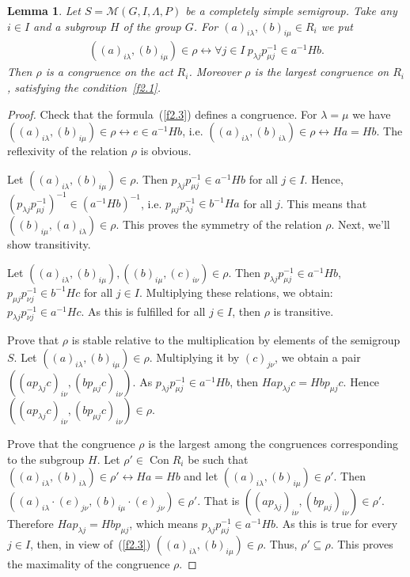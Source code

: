\documentclass{birkau}
\numberwithin{equation}{section}
\theoremstyle{plain}
\newtheorem{lemma}[theorem]{Lemma}
\theoremstyle{definition}
\DeclareMathOperator{\Con}{Con}
\begin{document}
	\begin{lemma} \label{l2.5}
		Let $S = \mathcal{M}(G,I,\Lambda,P)$ be a completely simple semigroup. Take any $i \in I$ and a subgroup $H$ of the group $G$. For $(a)_{i \lambda},(b)_{i \mu} \in R_i$ we put
		\begin{gather}
			((a)_{i \lambda},(b)_{i \mu}) \in \rho \leftrightarrow \forall j \in I \ p_{\lambda j} p_{\mu j}^{-1} \in a^{-1} H b. \label{f2.3}
		\end{gather}
		Then $\rho$ is a congruence on the act $R_i$. Moreover $\rho$ is the largest congruence on $R_i$, satisfying the condition~\eqref{f2.1}.
	\end{lemma}
	\begin{proof}
		Check that the formula~(\ref{f2.3}) defines a congruence. For $\lambda = \mu$ we have $((a)_{i \lambda},(b)_{i \mu}) \in \rho \leftrightarrow e \in a^{-1} H b$, i.e. $((a)_{i \lambda},(b)_{i \lambda}) \in \rho \leftrightarrow H a = H b$. The reflexivity of the relation $\rho$ is obvious.
		
		Let $((a)_{i \lambda},(b)_{i \mu}) \in \rho$. Then $p_{\lambda j} p_{\mu j}^{-1} \in a^{-1} H b$ for all $j \in I$. Hence, $(p_{\lambda j} p_{\mu j}^{-1})^{-1} \in (a^{-1} H b)^{-1}$, i.e. $p_{\mu j} p_{\lambda j}^{-1} \in b^{-1} H a$ for all $j$. This means that $((b)_{i \mu},(a)_{i \lambda}) \in \rho$. This proves the symmetry of the relation $\rho$. Next, we'll show transitivity.
		
		Let $((a)_{i \lambda},(b)_{i \mu}),((b)_{i \mu},(c)_{i \nu}) \in \rho$. Then $p_{\lambda j} p_{\mu j}^{-1} \in a^{-1} H b$, $p_{\mu j} p_{\nu j}^{-1} \in b^{-1} H c$ for all $j \in I$. Multiplying these relations, we obtain: $p_{\lambda j} p_{\nu j}^{-1} \in a^{-1} H c$. As this is fulfilled for all $j \in I$, then $\rho$ is transitive.
		
		Prove that $\rho$ is stable relative to the multiplication by elements of the semigroup $S$. Let $((a)_{i \lambda},(b)_{i \mu}) \in \rho$. Multiplying it by $(c)_{j \nu}$, we obtain a pair $((ap_{\lambda j}c)_{i \nu},(bp_{\mu j}c)_{i \nu})$. As $p_{\lambda j} p_{\mu j}^{-1} \in a^{-1} H b$, then $H a p_{\lambda j} c = H b p_{\mu j} c$. Hence $ \allowbreak ((a p_{\lambda j} c)_{i \nu},(b p_{\mu j} c)_{i \nu}) \in \rho$.
		
		Prove that the congruence $\rho$ is the largest among the congruences corresponding to the subgroup $H$. Let $\rho' \in \Con R_i$ be such that $((a)_{i \lambda},(b)_{i \lambda}) \in \rho' \leftrightarrow H a = H b$ and let $((a)_{i \lambda},(b)_{i \mu}) \in \rho'$. Then $((a)_{i \lambda} \cdot (e)_{j \nu},(b)_{i \mu} \cdot (e)_{j \nu}) \in \rho'$. That is $((a p_{\lambda j})_{i \nu},(b p_{\mu j})_{i \nu}) \in \rho'$. Therefore $H a p_{\lambda j} = H b p_{\mu j}$, which means $p_{\lambda j} p_{\mu j}^{-1} \in a^{-1}H b$. As this is true for every $j \in I$, then, in view of~(\ref{f2.3}) $((a)_{i \lambda},(b)_{i \mu}) \in \rho$. Thus, $\rho' \subseteq \rho$. This proves the maximality of the congruence $\rho$.
	\end{proof}
	
\end{document}
